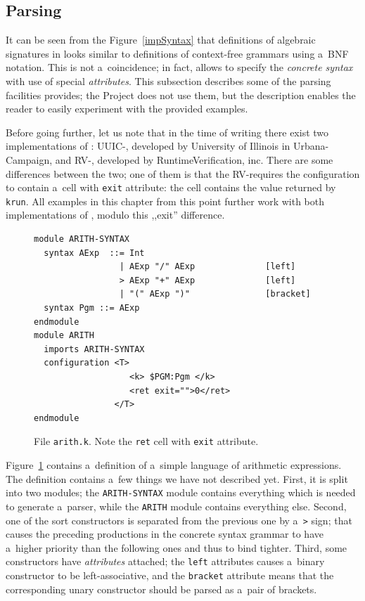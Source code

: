 \documentclass{fithesis3}
\newcommand{\krun}{\texttt{krun}\xspace}
\newcommand{\Project}{Project\xspace}
\begin{document}



\subsection{Parsing}
It can be seen from the Figure~\ref{impSyntax} that definitions of algebraic signatures in \K looks similar to definitions of context-free grammars using a~BNF notation. This is not a~coincidence; in fact, \K allows to specify the \textit{concrete syntax} with use of special \textit{attributes}. This subsection describes some of the parsing facilities \K provides; the \Project does not use them, but the description enables the reader to easily experiment with the provided examples.

Before going further, let us note that in the time of writing there exist two implementations of \K: UUIC-\K, developed by University of Illinois in Urbana-Campaign, and RV-\K, developed by RuntimeVerification, inc. There are some differences between the two; one of them is that the RV-\K requires the configuration to contain a~cell with \texttt{exit} attribute: the cell contains the value returned by \krun. All examples in this chapter from this point further work with both implementations of \K, modulo this ,,exit'' difference.

\begin{figure}
\begin{lstlisting}
module ARITH-SYNTAX
  syntax AExp  ::= Int
                 | AExp "/" AExp              [left]
                 > AExp "+" AExp              [left]
                 | "(" AExp ")"               [bracket]
  syntax Pgm ::= AExp
endmodule
module ARITH
  imports ARITH-SYNTAX  
  configuration <T>
                   <k> $PGM:Pgm </k>
                   <ret exit="">0</ret>
                </T>
endmodule
\end{lstlisting}
\caption{File \texttt{arith.k}. Note the \texttt{ret} cell with \texttt{exit} attribute.}
\label{arithSource}
\end{figure}

Figure~\ref{arithSource} contains a~definition of a~simple language of arithmetic expressions. The definition contains a~few things we have not described yet. First, it is split into two modules; the \texttt{ARITH-SYNTAX} module contains everything which is needed to generate a~parser, while the \texttt{ARITH} module contains everything else. Second, one of the sort constructors is separated from the previous one by a~\lstinline{>} sign; that causes the preceding productions in the concrete syntax grammar to have a~higher priority than the following ones and thus to bind tighter. Third, some constructors have \textit{attributes} attached; the \texttt{left} attributes causes a~binary constructor to be left-associative, and the \texttt{bracket} attribute means that the corresponding unary constructor should be parsed as a~pair of brackets.
\end{document}
